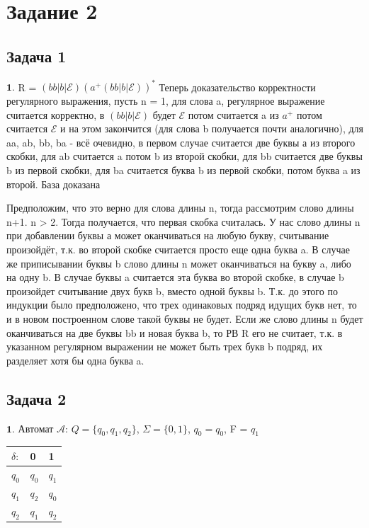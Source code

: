 \documentclass[a4paper,14pt]{article} %
\begin{document}

\section{Задание 2}
\subsection{Задача 1}

$\textbf{1.}$ R = $(bb|b|\mathcal{E})$$(a^{+}(bb|b|\mathcal{E}))^{*}$
Теперь доказательство корректности регулярного выражения, пусть n = 1, для слова a, регулярное выражение считается корректно, в $(bb|b|\mathcal{E})$ будет $\mathcal{E}$
потом считается a из $a^{+}$ потом считается $\mathcal{E}$ и на этом закончится (для слова b получается почти аналогично), для aa, ab, bb, ba - всё очевидно, в первом случае считается две буквы а из второго скобки, для ab считается a потом b из второй скобки, для bb считается две буквы b из первой скобки, для ba считается буква b из первой скобки, потом буква a из второй.
База доказана

Предположим, что это верно для слова длины n, тогда рассмотрим слово длины n+1.
n > 2. Тогда получается, что первая скобка считалась. У нас слово длины n при добавлении буквы а может оканчиваться на любую букву, считывание произойдёт, т.к. во второй скобке считается просто еще одна буква a.
В случае же приписывании буквы b слово длины n может оканчиваться на букву a, либо на одну b. В случае буквы a считается эта буква во второй скобке, в случае b произойдет считывание двух букв b, вместо одной буквы b.
Т.к. до этого по индукции было предположено, что трех одинаковых подряд идущих букв нет, то и в новом построенном слове такой буквы не будет. Если же слово длины n будет оканчиваться на две буквы bb и новая буква b, то РВ R его не считает, т.к. в указанном регулярном выражении не может быть трех букв b подряд, их разделяет хотя бы одна буква a.  

\subsection{Задача 2}
$\textbf{1.}$ Автомат $\mathcal{A}$: $Q = \{q_0, q_1, q_2\}$, $\Sigma = \{0, 1\}$, $q_0 = q_0$, F = $q_1$
\begin{tabular}{ | l | l | l | }
    \hline
    $\delta:$ & 0       & 1     \\ \hline
    $q_0$ & $q_0$   & $q_1$ \\
    $q_1$ & $q_2$   & $q_0$ \\
    $q_2$ & $q_1$   & $q_2$ \\
    \hline
    \end{tabular}
\end{document}
